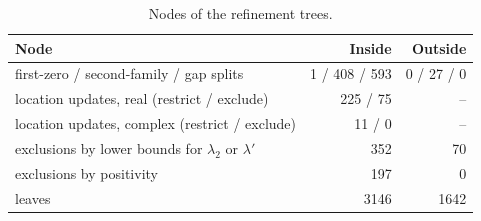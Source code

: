 \begin{table}[ht]
\centering
\small
\begin{tabular}{lrr}
\toprule
Node & Inside & Outside\\
\midrule
first-zero / second-family / gap splits & 1 / 408 / 593 & 0 / 27 / 0\\
location updates, real (restrict / exclude) & 225 / 75 & --\\
location updates, complex (restrict / exclude) & 11 / 0 & --\\
exclusions by lower bounds for $\lambda_2$ or $\lambda'$ & 352 & 70\\
exclusions by positivity & 197 & 0\\
leaves & 3146 & 1642\\
\bottomrule
\end{tabular}
\caption{Nodes of the refinement trees.}
\label{tab:nodes}
\end{table}

